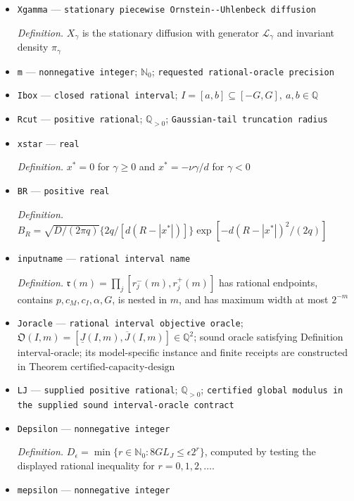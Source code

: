 \documentclass{article}
\begin{document}
\begin{itemize}
  \item \texttt{Xgamma} --- \texttt{stationary piecewise Ornstein-\allowbreak{}-\allowbreak{}Uhlenbeck diffusion}
  \par\smallskip\noindent\emph{Definition.} \(X_\gamma\) is the stationary diffusion with generator \(\mathcal L_\gamma\) and invariant density \(\pi_\gamma\)
  \item \texttt{m} --- \texttt{nonnegative integer}; \(\mathbb N_0\); \texttt{requested rational-\allowbreak{}oracle precision}
  \item \texttt{Ibox} --- \texttt{closed rational interval}; \(I=[a,b]\subseteq[-G,G],\ a,b\in\mathbb Q\)
  \item \texttt{Rcut} --- \texttt{positive rational}; \(\mathbb Q_{>0}\); \texttt{Gaussian-\allowbreak{}tail truncation radius}
  \item \texttt{xstar} --- \texttt{real}
  \par\smallskip\noindent\emph{Definition.} \(x^*=0\) for \(\gamma\ge0\) and \(x^*=-\nu\gamma/d\) for \(\gamma<0\)
  \item \texttt{BR} --- \texttt{positive real}
  \par\smallskip\noindent\emph{Definition.} \(B_R=\sqrt{D/(2\pi q)}\{2q/[d(R-|x^*|)]\}\exp[-d(R-|x^*|)^2/(2q)]\)
  \item \texttt{inputname} --- \texttt{rational interval name}
  \par\smallskip\noindent\emph{Definition.} \(\mathfrak r(m)=\prod_j[r^-_j(m),r^+_j(m)]\) has rational endpoints, contains \(p,c_M,c_I,\alpha,G\), is nested in \(m\), and has maximum width at most \(2^{-m}\)
  \item \texttt{Joracle} --- \texttt{rational interval objective oracle}; \(\mathfrak O(I,m)=[\underline J(I,m),\overline J(I,m)]\in\mathbb Q^2\); sound oracle satisfying Definition \(\mathrm{interval\mbox{-}oracle}\); its model-specific instance and finite receipts are constructed in Theorem \(\mathrm{certified\mbox{-}capacity\mbox{-}design}\)
  \item \texttt{LJ} --- \texttt{supplied positive rational}; \(\mathbb Q_{>0}\); \texttt{certified global modulus in the supplied sound interval-\allowbreak{}oracle contract}
  \item \texttt{Depsilon} --- \texttt{nonnegative integer}
  \par\smallskip\noindent\emph{Definition.} \(D_\epsilon=\min\{r\in\mathbb N_0:8GL_J\leq\epsilon2^r\}\), computed by testing the displayed rational inequality for \(r=0,1,2,\ldots\).
  \item \texttt{mepsilon} --- \texttt{nonnegative integer}

\end{itemize}
\end{document}
